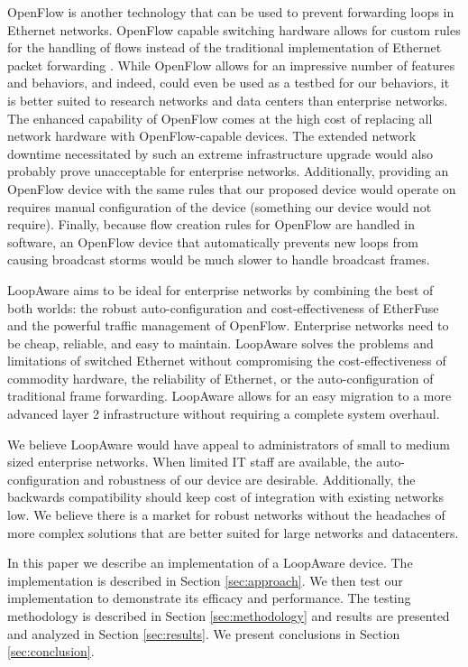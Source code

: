 	OpenFlow is another technology that can be used to prevent forwarding loops in Ethernet networks.
	OpenFlow capable switching hardware allows for custom rules for the handling of flows instead of the traditional implementation of Ethernet packet forwarding \cite{openflow}.
	While OpenFlow allows for an impressive number of features and behaviors, and indeed, could even be used as a testbed for our behaviors, it is better suited to research networks and data centers than enterprise networks.
	The enhanced capability of OpenFlow comes at the high cost of replacing all network hardware with OpenFlow-capable devices.
	The extended network downtime necessitated by such an extreme infrastructure upgrade would also probably prove unacceptable for enterprise networks.
	Additionally, providing an OpenFlow device with the same rules that our proposed device would operate on requires manual configuration of the device (something our device would not require).
	Finally, because flow creation rules for OpenFlow are handled in software, an OpenFlow device that automatically prevents new loops from causing broadcast storms would be much slower to handle broadcast frames.

	LoopAware aims to be ideal for enterprise networks by combining the best of both worlds: the robust auto-configuration and cost-effectiveness of EtherFuse and the powerful traffic management of OpenFlow.
	Enterprise networks need to be cheap, reliable, and easy to maintain.
	LoopAware solves the problems and limitations of switched Ethernet without compromising the cost-effectiveness of commodity hardware, the reliability of Ethernet, or the auto-configuration of traditional frame forwarding.
	LoopAware allows for an easy migration to a more advanced layer 2 infrastructure without requiring a complete system overhaul.
	
	We believe LoopAware would have appeal to administrators of small to medium sized enterprise networks.
	When limited IT staff are available, the auto-configuration and robustness of our device are desirable.
	Additionally, the backwards compatibility should keep cost of integration with existing networks low.
	We believe there is a market for robust networks without the headaches of more complex solutions that are better suited for large networks and datacenters.
	
	In this paper we describe an implementation of a LoopAware device.
	The implementation is described in Section \ref{sec:approach}.
	We then test our implementation to demonstrate its efficacy and performance.
	The testing methodology is described in Section \ref{sec:methodology} and results are presented and analyzed in Section \ref{sec:results}.
	We present conclusions in Section \ref{sec:conclusion}.
